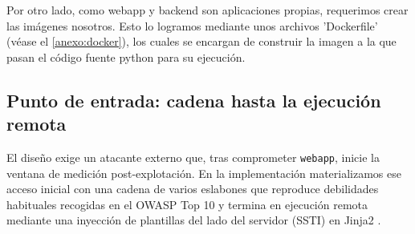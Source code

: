 \documentclass[11pt,spanish,listoffigures,listoftables]{tfgetsinf}
\begin{document}
        Por otro lado, como webapp y backend son aplicaciones propias, requerimos crear las imágenes nosotros. Esto lo logramos mediante unos archivos 'Dockerfile' (véase el \ref{anexo:docker}), los cuales se encargan de construir la imagen a la que pasan el código fuente python para su ejecución.

        
        \subsection{Punto de entrada: cadena hasta la ejecución remota}
        \label{sec:5.2.3}
        El diseño exige un atacante externo que, tras comprometer \texttt{webapp}, inicie la ventana de medición post-explotación. En la implementación materializamos ese acceso inicial con una cadena de varios eslabones que reproduce debilidades habituales recogidas en el OWASP Top 10 \cite{owasptop10} y termina en ejecución remota mediante una inyección de plantillas del lado del servidor (SSTI) en Jinja2 \cite{owaspssti,cwe1336}.
\end{document}
